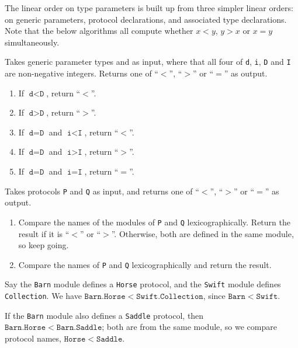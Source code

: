 \documentclass[../generics]{subfiles}
\begin{document}
The linear order on type parameters is built up from three simpler linear orders: on generic parameters, protocol declarations, and associated type declarations. Note that the below algorithms all compute whether $x<y$, $y>x$ or $x=y$ simultaneously.
\begin{algorithm}\label{generic parameter order} Takes generic parameter types  and  as input, where that all four of \texttt{d}, \texttt{i}, \texttt{D} and \texttt{I} are non-negative integers. Returns one of ``$<$'', ``$>$'' or ``$=$'' as output.
\begin{enumerate}
\item If $\texttt{d}<\texttt{D}$, return ``$<$''.
\item If $\texttt{d}>\texttt{D}$, return ``$>$''.
\item If $\texttt{d}=\texttt{D}$ and $\texttt{i}<\texttt{I}$, return ``$<$''.
\item If $\texttt{d}=\texttt{D}$ and $\texttt{i}>\texttt{I}$, return ``$>$''.
\item If $\texttt{d}=\texttt{D}$ and $\texttt{i}=\texttt{I}$, return ``$=$''.
\end{enumerate}
\end{algorithm}
%
\begin{algorithm} \label{linear protocol order} Takes protocols \texttt{P} and \texttt{Q} as input, and returns one of ``$<$'', ``$>$'' or ``$=$'' as output.
\begin{enumerate}
\item Compare the names of the modules of \texttt{P} and \texttt{Q} lexicographically. Return the result if it is ``$<$'' or ``$>$''. Otherwise, both are defined in the same module, so keep going.
\item Compare the names of \texttt{P} and \texttt{Q} lexicographically and return the result.
\end{enumerate}
\end{algorithm}
\begin{example}
Say the \texttt{Barn} module defines a \texttt{Horse} protocol, and the \texttt{Swift} module defines \texttt{Collection}. We have $\mathtt{Barn.Horse}<\mathtt{Swift.Collection}$, since $\mathtt{Barn}<\mathtt{Swift}$.

If the \texttt{Barn} module also defines a \texttt{Saddle} protocol, then $\mathtt{Barn.Horse}<\mathtt{Barn.Saddle}$; both are from the same module, so we compare protocol names, $\mathtt{Horse}<\mathtt{Saddle}$.
\end{example}
\end{document}
